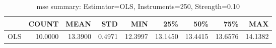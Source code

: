\begin{table}[ht]
\centering
\caption{mse summary: Estimator=OLS, Instruments=250, Strength=0.10}
\begin{tabular}{lrrrrrrrr}
\toprule
 & COUNT & MEAN & STD & MIN & 25\% & 50\% & 75\% & MAX \\
\midrule
OLS & 10.0000 & 13.3900 & 0.4971 & 12.3997 & 13.1450 & 13.4415 & 13.6576 & 14.1382 \\
\bottomrule
\end{tabular}
\end{table}

